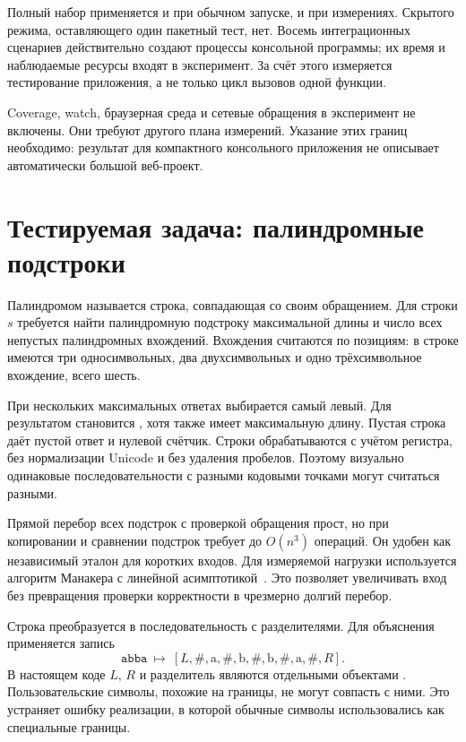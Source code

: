 Полный набор применяется и при обычном запуске, и при измерениях. Скрытого режима, оставляющего один пакетный тест, нет. Восемь интеграционных сценариев действительно создают процессы консольной программы; их время и наблюдаемые ресурсы входят в эксперимент. За счёт этого измеряется тестирование приложения, а не только цикл вызовов одной функции.

Coverage, watch, браузерная среда и сетевые обращения в эксперимент не включены. Они требуют другого плана измерений. Указание этих границ необходимо: результат для компактного консольного приложения не описывает автоматически большой веб-проект.

\section{Тестируемая задача: палиндромные подстроки}
Палиндромом называется строка, совпадающая со своим обращением. Для строки $s$ требуется найти палиндромную подстроку максимальной длины и число всех непустых палиндромных вхождений. Вхождения считаются по позициям: в строке  имеются три односимвольных, два двухсимвольных и одно трёхсимвольное вхождение, всего шесть.

При нескольких максимальных ответах выбирается самый левый. Для  результатом становится , хотя  также имеет максимальную длину. Пустая строка даёт пустой ответ и нулевой счётчик. Строки обрабатываются с учётом регистра, без нормализации Unicode и без удаления пробелов. Поэтому визуально одинаковые последовательности с разными кодовыми точками могут считаться разными.

Прямой перебор всех подстрок с проверкой обращения прост, но при копировании и сравнении подстрок требует до $O(n^3)$ операций. Он удобен как независимый эталон для коротких входов. Для измеряемой нагрузки используется алгоритм Манакера с линейной асимптотикой~\cite{manacher}. Это позволяет увеличивать вход без превращения проверки корректности в чрезмерно долгий перебор.

Строка преобразуется в последовательность с разделителями. Для объяснения применяется запись
\[
 \texttt{abba}\ \longmapsto\
 [L,\#,\mathrm a,\#,\mathrm b,\#,\mathrm b,\#,\mathrm a,\#,R].
\]
В настоящем коде $L$, $R$ и разделитель являются отдельными объектами . Пользовательские символы, похожие на границы, не могут совпасть с ними. Это устраняет ошибку реализации, в которой обычные символы использовались как специальные границы.


